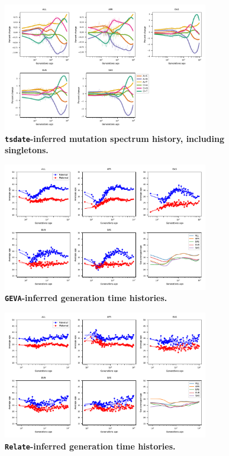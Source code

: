 \documentclass[]{article}
\newcommand{\GEVA}{\texttt{GEVA}\xspace}
\newcommand{\tsdate}{\texttt{tsdate}\xspace}
\newcommand{\relate}{\texttt{Relate}\xspace}
\begin{document}
\begin{figure}[ht!]
    \centering
    \includegraphics[width=0.8\textwidth]{../plots/spectrum_history.tsdate.max_age.10000.singletons.pdf}
    \caption{
        \textbf{\tsdate-inferred mutation spectrum history, including singletons.}
    }
    \label{fig:tsdate-spectra-singletons}
\end{figure}


\begin{figure}[ht!]
    \centering
    \includegraphics[width=0.8\textwidth]{../plots/inferred_generation_times.DM.geva.max_age.10000.pdf}
    \caption{
        \textbf{\GEVA-inferred generation time histories.}
    }
    \label{fig:geva-gen-times}
\end{figure}

\begin{figure}[ht!]
    \centering
    \includegraphics[width=0.8\textwidth]{../plots/inferred_generation_times.DM.relate.max_age.10000.pdf}
    \caption{
        \textbf{\relate-inferred generation time histories.}
    }
    \label{fig:relate-gen-times}
\end{figure}
\end{document}
